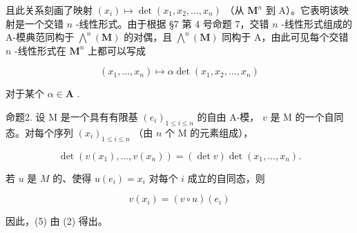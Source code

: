 且此关系刻画了映射 \((x_{i})\mapsto\det(x_{1},x_{2},\ldots,x_{n})\) （从 \(\mathbf{M}^{n}\) 到 A）。它表明该映射是一个交错 \(n\) -线性形式。由于根据 §7 第 4 号命题 7，交错 \(n\) -线性形式组成的 A-模典范同构于 \(\bigwedge^{n}(\mathbf{M})\) 的对偶，且 \(\bigwedge^{n}(\mathbf{M})\) 同构于 A，由此可见每个交错 \(n\) -线性形式在 \(\mathbf{M}^{n}\) 上都可以写成

\[
(x _ {1}, \dots , x _ {n}) \mapsto \alpha \det (x _ {1}, x _ {2}, \dots , x _ {n})
\]

对于某个 \(\alpha \in \mathbf{A}\) .

命题2. 设 M 是一个具有有限基 \((e_i)_{1 \leqslant i \leqslant n}\) 的自由 A-模， \(v\) 是 M 的一个自同态。对每个序列 \((x_i)_{1 \leqslant i \leqslant n}\) （由 \(n\) 个 M 的元素组成），

\[
\det (v (x _ {1}), \dots , v (x _ {n})) = (\det v) \det (x _ {1}, \dots , x _ {n}).\tag{5}
\]

若 \(u\) 是 \(M\) 的、使得 \(u(e_i) = x_i\) 对每个 \(i\) 成立的自同态，则

\[
v (x _ {i}) = (v \circ u) (e _ {i})
\]

因此，(5) 由 (2) 得出。

